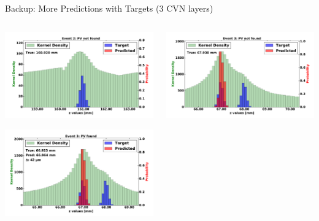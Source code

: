 \begin{frame}{Backup: More Predictions with Targets (3 CVN layers)}
  \begin{columns}[c]
        \begin{center}
            \includegraphics[width=1\textwidth,height=0.45\textwidth, trim=18 0 18 0]{images/120000_3layer_16.pdf}
    
            \includegraphics[width=1\textwidth, height=0.45\textwidth,trim=18 0 18 0]{images/120000_3layer_17.pdf}

        \end{center}
        \begin{center}
           \includegraphics[width=1\textwidth, height=0.45\textwidth, trim=18 0 18 0]{images/120000_3layer_18.pdf}
    

\end{center}
\end{columns}
\end{frame}

